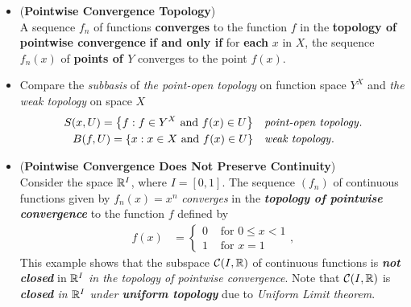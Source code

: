 \documentclass[11pt]{article}
\begin{document}
\begin{itemize}
\item \begin{proposition} (\textbf{Pointwise Convergence Topology})\citep{munkres2000topology}\\
A sequence $f_n$ of functions \textbf{converges} to the function $f$ in the \textbf{topology of pointwise convergence} \textbf{if and only if} for \textbf{each} $x$ in $X$, the sequence $f_n(x)$ of \textbf{points of $Y$} converges to the point $f(x)$.
\end{proposition}


\item \begin{remark}
Compare the \emph{subbasis} of \emph{the point-open topology} on function space $Y^X$ and \emph{the weak topology} on space $X$
\begin{align*}
S(x, U) = \left\{f:  f \in Y^X\text{ and }f(x) \in U\right\} &\quad \text{\emph{point-open topology}}.\\
B(f, U) = \left\{x:  x \in X\text{ and }f(x) \in U\right\} &\quad \text{\emph{weak topology}}.
\end{align*}
\end{remark}

\item \begin{example} (\textbf{Pointwise Convergence Does Not Preserve Continuity})\\
Consider the space ${\mathbb R}^I$, where $I = [0, 1]$. The sequence $(f_n)$ of continuous functions given by $f_n(x) = x^n$ \emph{converges} in the \emph{\textbf{topology of pointwise convergence}} to the function $f$ defined by
\begin{align*}
f(x) &=\left\{ 
\begin{array}{cc}
0 &\text{ for } 0 \le x < 1\\
1 &\text{ for } x = 1
\end{array}\right.,
\end{align*}
This example shows that the subspace ${\mathcal C}(I, {\mathbb R})$ of continuous functions is \emph{\textbf{not closed}} in ${\mathbb R}^I$
\emph{in the topology of pointwise convergence}. Note that ${\mathcal C}(I, {\mathbb R})$  is \emph{\textbf{closed} in ${\mathbb R}^I$ under \textbf{uniform topology}} due to \emph{Uniform Limit theorem}. 
\end{example}


\end{itemize}
\end{document}
